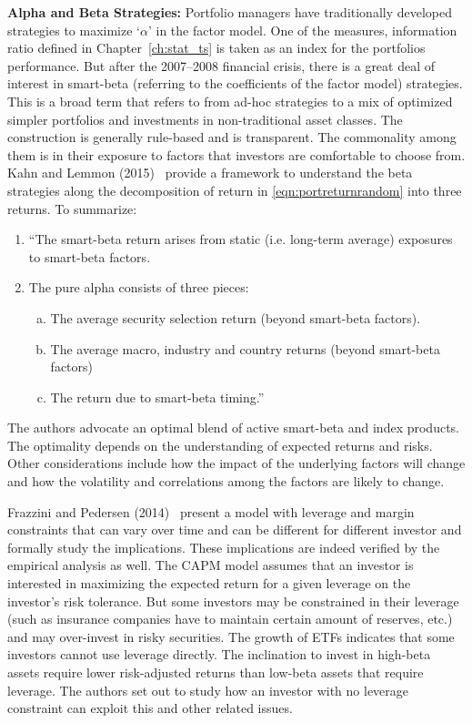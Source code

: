 \noindent\textbf{Alpha and Beta Strategies:} Portfolio managers have traditionally developed strategies to maximize `$\alpha$' in the factor model. One of the measures, information ratio defined in Chapter~\ref{ch:stat_ts} is taken as an index for the portfolios performance. But after the 2007--2008 financial crisis, there is a great deal of interest in smart-beta (referring to the coefficients of the factor model) strategies. This is a broad term that refers to from ad-hoc strategies to a mix of optimized simpler portfolios and investments in non-traditional asset classes. The construction is generally rule-based and is transparent. The commonality among them is in their exposure to factors that investors are comfortable to choose from. Kahn and Lemmon (2015)~\cite{lemmon} provide a framework to understand the beta strategies along the decomposition of return in \eqref{eqn:portreturnrandom} into three returns. To summarize:
	\begin{enumerate}[--]
	\item ``The smart-beta return arises from static (i.e. long-term average) exposures to smart-beta factors.
	\item The pure alpha consists of three pieces:
		\begin{enumerate}[a.]
		\item The average security selection return (beyond smart-beta factors).
		\item The average macro, industry and country returns (beyond smart-beta factors)
		\item The return due to smart-beta timing.''
		\end{enumerate}
	\end{enumerate}
The authors advocate an optimal blend of active smart-beta and index products. The optimality depends on the understanding of expected returns and risks. Other considerations include how the impact of the underlying factors will change and how the volatility and correlations among the factors are likely to change. 


Frazzini and Pedersen (2014)~\cite{frazped} present a model with leverage and margin constraints that can vary over time and can be different for different investor and formally study the implications. These implications are indeed verified by the empirical analysis as well. The CAPM model assumes that an investor is interested in maximizing the expected return for a given leverage on the investor's risk tolerance. But some investors may be constrained in their leverage (such as insurance companies have to maintain certain amount of reserves, etc.) and may over-invest in risky securities. The growth of ETFs indicates that some investors cannot use leverage directly. The inclination to invest in high-beta assets require lower risk-adjusted returns than low-beta assets that require leverage. The authors set out to study how an investor with no leverage constraint can exploit this and other related issues. 


